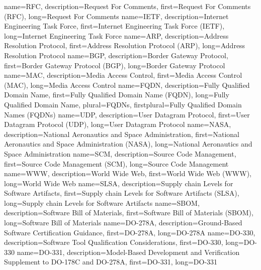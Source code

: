 {%
    name={RFC},
    description={Request For Comments},
    first={Request For Comments (RFC)},
    long={Request For Comments}
}
{%
    name={IETF},
    description={Internet Engineering Task Force},
    first={Internet Engineering Task Force (IETF)},
    long={Internet Engineering Task Force}
}
{%
    name={ARP},
    description={Address Resolution Protocol},
    first={Address Resolution Protocol (ARP)},
    long={Address Resolution Protocol}
}
{%
    name={BGP},
    description={Border Gateway Protocol},
    first={Border Gateway Protocol (BGP)},
    long={Border Gateway Protocol}
}
{%
    name={MAC},
    description={Media Access Control},
    first={Media Access Control (MAC)},
    long={Media Access Control}
}
{%
    name={FQDN},
    description={Fully Qualified Domain Name},
    first={Fully Qualified Domain Name (FQDN)},
    long={Fully Qualified Domain Name},
    plural={FQDNs},
    firstplural={Fully Qualified Domain Names (FQDNs)}
}
{%
    name={UDP},
    description={User Datagram Protocol},
    first={User Datagram Protocol (UDP)},
    long={User Datagram Protocol}
}
{%
    name={NASA},
    description={National Aeronautics and Space Administration},
    first={National Aeronautics and Space Administration (NASA)},
    long={National Aeronautics and Space Administration}
}
{%
    name={SCM},
    description={Source Code Management},
    first={Source Code Management (SCM)},
    long={Source Code Management}
}
{%
    name={WWW},
    description={World Wide Web},
    first={World Wide Web (WWW)},
    long={World Wide Web}
}
{%
    name={SLSA},
    description={Supply chain Levels for Software Artifacts},
    first={Supply chain Levels for Software Artifacts (SLSA)},
    long={Supply chain Levels for Software Artifacts}
}
{%
    name={SBOM},
    description={Software Bill of Materials},
    first={Software Bill of Materials (SBOM)},
    long={Software Bill of Materials}
}
{%
    name={DO-278A},
    description={Ground-Based Software Certification Guidance},
    first={DO-278A},
    long={DO-278A}
}
{%
    name={DO-330},
    description={Software Tool Qualification Considerations},
    first={DO-330},
    long={DO-330}
}
{%
    name={DO-331},
    description={Model-Based Development and Verification Supplement to DO-178C and DO-278A},
    first={DO-331},
    long={DO-331}
}
